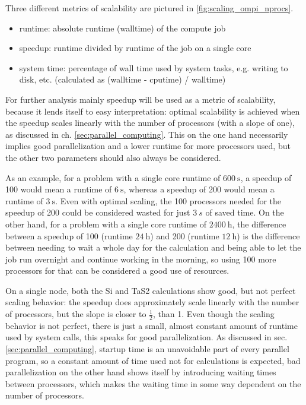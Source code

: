 \documentclass[main.tex]{subfiles}
\begin{document}
Three different metrics of scalability are pictured in \ref{fig:scaling_ompi_nprocs}.
\begin{itemize}
    \item runtime: absolute runtime (walltime) of the compute job
    \item speedup: runtime divided by runtime of the job on a single core
    \item system time: percentage of wall time used by system tasks, e.g. writing to disk, etc. (calculated as (walltime - cputime) / walltime)
\end{itemize}
For further analysis mainly speedup will be used as a metric of scalability, because it lends itself to easy interpretation: optimal scalability is achieved when the speedup scales linearly with the number of processors (with a slope of one), as discussed in ch. \ref{sec:parallel_computing}.
This on the one hand necessarily implies good parallelization and a lower runtime for more processors used, but the other two parameters should also always be considered.

As an example, for a problem with a single core runtime of \(\SI{600}{\s}\), a speedup of 100 would mean a runtime of \(\SI{6}{\s}\), whereas a speedup of 200 would mean a runtime of \(\SI{3}{\s}\).
Even with optimal scaling, the 100 processors needed for the speedup of 200 could be considered wasted for just \(\SI{3}{s}\) of saved time.
On the other hand, for a problem with a single core runtime of \(\SI{2400}{\hour}\), the difference between a speedup of 100 (runtime \(\SI{24}{\hour}\)) and 200 (runtime \(\SI{12}{\hour}\)) is the difference between needing to wait a whole day for the calculation and being able to let the job run overnight and continue working in the morning, so using 100 more processors for that can be considered a good use of resources.

On a single node, both the Si and TaS2 calculations show good, but not perfect scaling behavior: the speedup does approximately scale linearly with the number of processors, but the slope is closer to \(\frac{1}{2}\), than 1.
Even though the scaling behavior is not perfect, there is just a small, almost constant amount of runtime used by system calls, this speaks for good parallelization.
As discussed in sec. \ref{sec:parallel_computing}, startup time is an unavoidable part of every parallel program, so a constant amount of time used not for calculations is expected, bad parallelization on the other hand shows itself by introducing waiting times between processors, which makes the waiting time in some way dependent on the number of processors.
\end{document}

